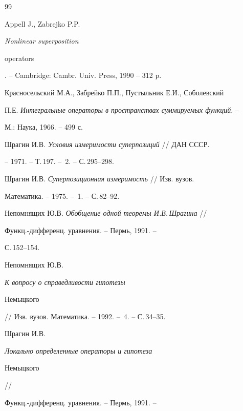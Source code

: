 \begin{thebibliography}{99} 


 




Appell J., Zabrejko P.P. {\em Nonlinear superposition


operators}. -- Cambridge: Cambr. Univ. Press, 1990 -- 312 p.







Красносельский М.А., Забрейко П.П., Пустыльник Е.И., Соболевский


П.Е. {\em Интегральные операторы в пространствах суммируемых функций}. --


М.: Наука, 1966. -- 499 с.







Шрагин И.В. {\em Условия измеримости суперпозиций} // ДАН СССР.


-- 1971. -- Т.\,197. -- \No\,2. -- С.\,295--298.







Шрагин И.В. {\em Суперпозиционная измеримость} // Изв. вузов.


Математика. -- 1975. -- \No\,1. -- С.\,82--92.







Непомнящих Ю.В. {\em Обобщение одной теоремы И.В.\,Шрагина} //


Функц.-дифференц. уравнения. -- Пермь, 1991. --


С.\,152--154.







Непомнящих Ю.В. {\em К вопросу о справедливости гипотезы


Немыцкого} // Изв. вузов. Математика. -- 1992. -- \No\,4. -- С.\,34--35.







Шрагин И.В. {\em Локально определенные операторы и гипотеза


Немыцкого} //


Функц.-дифференц. уравнения. -- Пермь, 1991. --



\end{thebibliography}

